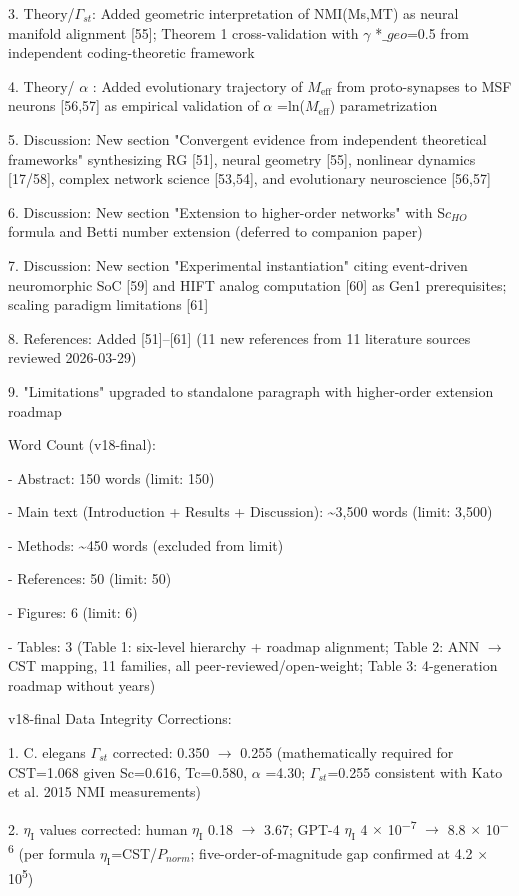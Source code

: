 \documentclass[a4paper,12pt]{article}
\begin{document}
3. Theory/$\Gamma_{st}$: Added geometric interpretation of NMI(Ms,MT) as neural manifold alignment [55]; Theorem 1 cross-validation with  $\gamma$ *$\_geo$=0.5 from independent coding-theoretic framework

4. Theory/ $\alpha$ : Added evolutionary trajectory of $M_{\text{eff}}$ from proto-synapses to MSF neurons [56,57] as empirical validation of  $\alpha$ =ln($M_{\text{eff}}$) parametrization

5. Discussion: New section "Convergent evidence from independent theoretical frameworks" synthesizing RG [51], neural geometry [55], nonlinear dynamics [17/58], complex network science [53,54], and evolutionary neuroscience [56,57]

6. Discussion: New section "Extension to higher-order networks" with S$c_{HO}$ formula and Betti number extension (deferred to companion paper)

7. Discussion: New section "Experimental instantiation" citing event-driven neuromorphic SoC [59] and HIFT analog computation [60] as Gen1 prerequisites; scaling paradigm limitations [61]

8. References: Added [51]--[61] (11 new references from 11 literature sources reviewed 2026-03-29)

9. "Limitations" upgraded to standalone paragraph with higher-order extension roadmap

Word Count (v18-final):

- Abstract: 150 words \checkmark (limit: 150)

- Main text (Introduction + Results + Discussion): \textasciitilde{}3,500 words \checkmark (limit: 3,500)

- Methods: \textasciitilde{}450 words (excluded from limit)

- References: 50 \checkmark (limit: 50)

- Figures: 6 \checkmark (limit: 6)

- Tables: 3 (Table 1: six-level hierarchy + roadmap alignment; Table 2: ANN $\rightarrow$ CST mapping, 11 families, all peer-reviewed/open-weight; Table 3: 4-generation roadmap without years)

v18-final Data Integrity Corrections:

1. C. elegans $\Gamma_{st}$ corrected: 0.350 $\rightarrow$ 0.255 (mathematically required for CST=1.068 given Sc=0.616, Tc=0.580,  $\alpha$ =4.30; $\Gamma_{st}$=0.255 consistent with Kato et al. 2015 NMI measurements)

2. $\eta_{\text{I}}$ values corrected: human $\eta_{\text{I}}$ 0.18 $\rightarrow$ 3.67; GPT-4 $\eta_{\text{I}}$ 4 $\times$ 10\textsuperscript{$-$}\textsuperscript{7} $\rightarrow$ 8.8 $\times$ 10\textsuperscript{$-$}\textsuperscript{6} (per formula $\eta_{\text{I}}$=CST/$P_{norm}$; five-order-of-magnitude gap confirmed at 4.2 $\times$ 10\textsuperscript{5})
\end{document}
